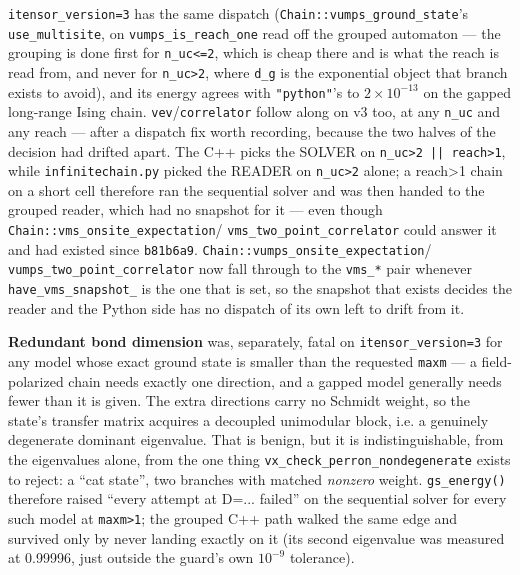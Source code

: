 \documentclass[11pt]{article}
\begin{document}
\texttt{itensor\_version=3} has the same dispatch
(\texttt{Chain::vumps\_ground\_state}'s \texttt{use\_multisite}, on
\texttt{vumps\_is\_reach\_one} read off the grouped automaton --- the
grouping is done first for \texttt{n\_uc<=2}, which is cheap there and is
what the reach is read from, and never for \texttt{n\_uc>2}, where
\texttt{d\_g} is the exponential object that branch exists to avoid), and
its energy agrees with \texttt{"python"}'s to $2\times10^{-13}$ on the
gapped long-range Ising chain. \texttt{vev}/\texttt{correlator} follow along on
v3 too, at any \texttt{n\_uc} and any reach --- after a dispatch fix worth
recording, because the two halves of the decision had drifted apart. The
C++ picks the SOLVER on \texttt{n\_uc>2 || reach>1}, while
\texttt{infinitechain.py} picked the READER on \texttt{n\_uc>2} alone; a
reach>1 chain on a short cell therefore ran the sequential solver and was
then handed to the grouped reader, which had no snapshot for it --- even
though \texttt{Chain::vms\_onsite\_expectation}/
\texttt{vms\_two\_point\_correlator} could answer it and had existed since
\texttt{b81b6a9}. \texttt{Chain::vumps\_onsite\_expectation}/
\texttt{vumps\_two\_point\_correlator} now fall through to the
\texttt{vms\_*} pair whenever \texttt{have\_vms\_snapshot\_} is the one
that is set, so the snapshot that exists decides the reader and the Python
side has no dispatch of its own left to drift from it.

\textbf{Redundant bond dimension} was, separately, fatal on
\texttt{itensor\_version=3} for any model whose exact ground state is
smaller than the requested \texttt{maxm} --- a field-polarized chain needs
exactly one direction, and a gapped model generally needs fewer than it is
given. The extra directions carry no Schmidt weight, so the state's
transfer matrix acquires a decoupled unimodular block, i.e. a genuinely
degenerate dominant eigenvalue. That is benign, but it is
indistinguishable, from the eigenvalues alone, from the one thing
\texttt{vx\_check\_perron\_nondegenerate} exists to reject: a ``cat
state'', two branches with matched \emph{nonzero} weight.
\texttt{gs\_energy()} therefore raised ``every attempt at D=... failed''
on the sequential solver for every such model at \texttt{maxm>1}; the
grouped C++ path walked the same edge and survived only by never landing
exactly on it (its second eigenvalue was measured at 0.99996, just
outside the guard's own $10^{-9}$ tolerance).
\end{document}
